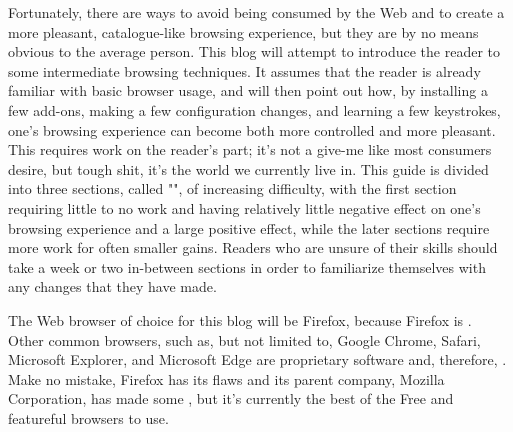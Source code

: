 \documentclass{article}
\begin{document}
Fortunately, there are ways to avoid being consumed by the Web and to create a more pleasant, catalogue-like browsing experience, but they are by no means obvious to the average person.  This blog will attempt to introduce the reader to some intermediate browsing techniques.  It assumes that the reader is already familiar with basic browser usage, and will then point out how, by installing a few add-ons, making a few configuration changes, and learning a few keystrokes, one's browsing experience can become both more controlled and more pleasant.  This requires work on the reader's part; it's not a give-me like most consumers desire, but tough shit, it's the world we currently live in.  This guide is divided into three sections, called "", of increasing difficulty, with the first section requiring little to no work and having relatively little negative effect on one's browsing experience and a large positive effect, while the later sections require more work for often smaller gains.  Readers who are unsure of their skills should take a week or two in-between sections in order to familiarize themselves with any changes that they have made.

The Web browser of choice for this blog will be Firefox, because Firefox is .  Other common browsers, such as, but not limited to, Google Chrome, Safari, Microsoft Explorer, and Microsoft Edge are proprietary software and, therefore, .  Make no mistake, Firefox has its flaws and its parent company, Mozilla Corporation, has made some , but it's currently the best of the Free and featureful browsers to use.
\end{document}
